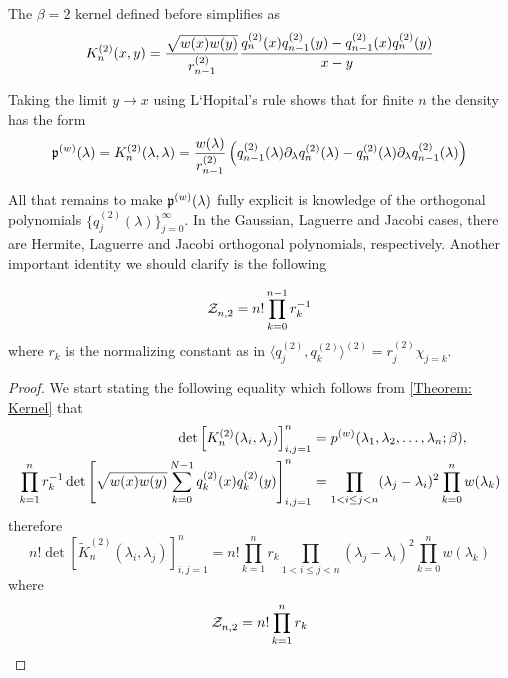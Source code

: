 \begin{proposicao}
	The $\beta=2$ kernel defined before simplifies as
	\begin{equation}
		K_n^{(2)}(x,y) = \frac{\sqrt{w(x) w(y)}}{r_{n-1}^{(2)}} \frac{q_n^{(2)}(x)q_{n-1}^{(2)}(y) - q_{n-1}^{(2)}(x)q_n^{(2)}(y)}{x-y}
	\end{equation}
	\label{proposition: Kernel Simplification beta 2}
\end{proposicao}
Taking the limit $y \rightarrow x$ using L`Hopital's rule shows that for finite $n$ the density has the form
\begin{equation}
	\mathfrak{p}^{(w)}(\lambda) = K_n^{(2)}(\lambda, \lambda) = \frac{w(\lambda)}{r_{n-1}^{(2)}} \left( q_{n-1}^{(2)}(\lambda)\partial_\lambda q_{n}^{(2)}(\lambda) - q_{n}^{(2)}(\lambda)\partial_\lambda q_{n-1}^{(2)}(\lambda)  \right)
	\label{Equation: Equilibrium Measure and Kernel}
\end{equation}

All that remains to make $\mathfrak{p}^{(w)}(\lambda)$ fully explicit is knowledge of the orthogonal polynomials $\{q_j^{(2)}(\lambda)\}_{j=0}^\infty$. In the Gaussian, Laguerre and Jacobi cases, there are Hermite, Laguerre and Jacobi orthogonal polynomials, respectively. Another important identity we should clarify is the following

\begin{proposicao}
	\begin{equation}
		\mathcal{Z}_{n,2}^{} = n! \prod_{k=0}^{n-1} r_k^{-1}
	\end{equation}
	where $r_k$ is the normalizing constant as in $\langle q_j^{(2)}, q_k^{(2)} \rangle^{(2)} = r_j^{(2)} \chi_{j=k}$.
	\label{proposition: Partition function}
\end{proposicao}
\begin{proof}
	We start stating the following equality which follows from \ref{Theorem: Kernel} that
	\begin{align}
			\det\left[ K_n^{(2)}(\lambda_i, \lambda_j) \right]_{i,j=1}^{n} & =  p^{(w)}(\lambda_1, \lambda_2, \dots, \lambda_n;\beta), \\
			\prod_{k=1}^n r_k^{-1}  \det\left[ \sqrt{w(x) w(y)} \sum_{k=0}^{N-1} q_k^{(2)}(x) q_k^{(2)}(y) \right]_{i,j=1}^{n} & = \prod_{1 < i \leq j < n} (\lambda_j - \lambda_i)^2 \prod_{k=0}^{n} w(\lambda_k)
	\end{align}
	therefore
	\begin{equation}
		n! \det\left[ \tilde{K}_n^{(2)}(\lambda_i, \lambda_j) \right]_{i,j=1}^{n} = n! \prod_{k=1}^n r_k \prod_{1 < i \leq j < n} (\lambda_j - \lambda_i)^2 \prod_{k=0}^{n} w(\lambda_k)
	\end{equation}
	where
	\begin{equation}
		\mathcal{Z}_{n,2}^{} = n! \prod_{k=1}^n r_k
	\end{equation}
\end{proof}